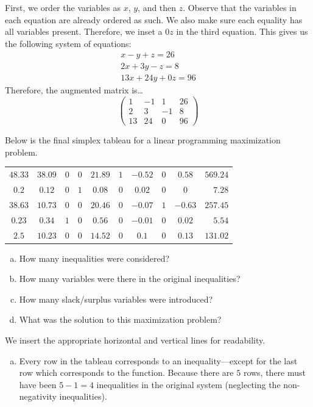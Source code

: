\documentclass[12pt,letterpaper]{exam}
\begin{document}
\begin{questions}
\sol First, we order the variables as $x$, $y$, and then $z$. Observe that the variables in each equation are already ordered as such. We also make sure each equality has all variables present. Therefore, we inset a $0z$ in the third equation. This gives us the following system of equations:
	\[
	\begin{gathered}
	x - y + z= 26 \\
	2x + 3y - z= 8 \\
	13x + 24y + 0z= 96
	\end{gathered}
	\]
Therefore, the augmented matrix is\dots
	\[
	\begin{pmatrix}
	1 & -1 & 1 & 26 \\
	2 & 3 & -1 & 8 \\
	13 & 24 & 0 & 96
	\end{pmatrix}
	\]



\newpage
\question[10] Below is the final simplex tableau for a linear programming maximization problem. \par
	\begin{table}[H]
	\centering
	\begin{tabular}{ccccccccc|r}
	$48.33$ & $38.09$ & $0$ & $0$ & $21.89$ & $1$ & $-0.52$ & $0$ & $0.58$ & $569.24$ \\
	$0.2$ & $0.12$ & $0$ & $1$ & $0.08$ & $0$ & $0.02$ & $0$ & $0$ & $7.28$ \\
	$38.63$ & $10.73$ & $0$ & $0$ & $20.46$ & $0$ & $-0.07$ & $1$ & $-0.63$ & $257.45$ \\
	$0.23$ & $0.34$ & $1$ & $0$ & $0.56$ & $0$ & $-0.01$ & $0$ & $0.02$ & $5.54$ \\ \hline
	$2.5$ & $10.23$ & $0$ & $0$ & $14.52$ & $0$ & $0.1$ & $0$ & $0.13$ & $131.02$
	\end{tabular}
	\end{table} \par

\begin{enumerate}[(a)]
\item How many inequalities were considered?
\item How many variables were there in the original inequalities?
\item How many slack/surplus variables were introduced?
\item What was the solution to this maximization problem?
\end{enumerate} \pspace

\sol We insert the appropriate horizontal and vertical lines for readability. 
\begin{enumerate}[(a)]
\item Every row in the tableau corresponds to an inequality---except for the last row which corresponds to the function. Because there are $5$ rows, there must have been $5 - 1= 4$ inequalities in the original system (neglecting the non-negativity inequalities). 


\end{enumerate}
\end{questions}
\end{document}
